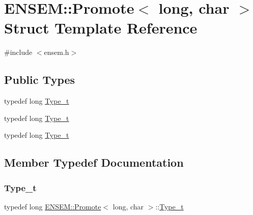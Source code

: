 \hypertarget{structENSEM_1_1Promote_3_01long_00_01char_01_4}{}\section{E\+N\+S\+EM\+:\+:Promote$<$ long, char $>$ Struct Template Reference}
\label{structENSEM_1_1Promote_3_01long_00_01char_01_4}


{\ttfamily \#include $<$ensem.\+h$>$}

\subsection*{Public Types}
\begin{DoxyCompactItemize}
\item 
typedef long \mbox{\hyperlink{structENSEM_1_1Promote_3_01long_00_01char_01_4_a375f85fa724594195cd72e89a7f3a20c}{Type\+\_\+t}}
\item 
typedef long \mbox{\hyperlink{structENSEM_1_1Promote_3_01long_00_01char_01_4_a375f85fa724594195cd72e89a7f3a20c}{Type\+\_\+t}}
\item 
typedef long \mbox{\hyperlink{structENSEM_1_1Promote_3_01long_00_01char_01_4_a375f85fa724594195cd72e89a7f3a20c}{Type\+\_\+t}}
\end{DoxyCompactItemize}


\subsection{Member Typedef Documentation}
\mbox{\label{structENSEM_1_1Promote_3_01long_00_01char_01_4_a375f85fa724594195cd72e89a7f3a20c}} 
\subsubsection{\texorpdfstring{Type\_t}{Type\_t}\hspace{0.1cm}{\footnotesize\ttfamily [1/3]}}
{\footnotesize\ttfamily typedef long \mbox{\hyperlink{structENSEM_1_1Promote}{E\+N\+S\+E\+M\+::\+Promote}}$<$ long, char $>$\+::\mbox{\hyperlink{structENSEM_1_1Promote_3_01long_00_01char_01_4_a375f85fa724594195cd72e89a7f3a20c}{Type\+\_\+t}}}

\mbox{\label{structENSEM_1_1Promote_3_01long_00_01char_01_4_a375f85fa724594195cd72e89a7f3a20c}} 
